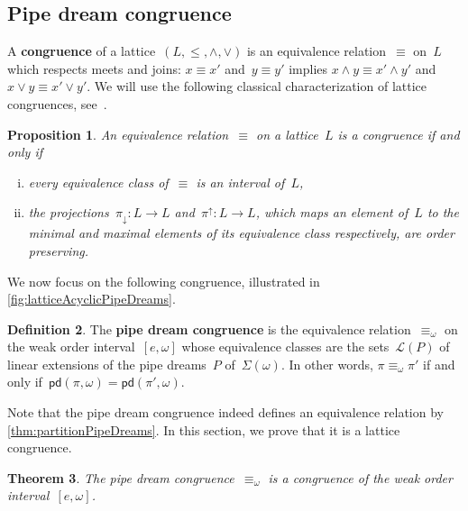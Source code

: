 \documentclass[reqno]{amsart}
\newtheorem{theorem}{Theorem}[section]
\newtheorem{proposition}[theorem]{Proposition}
\theoremstyle{definition}
\newtheorem{definition}[theorem]{Definition}
\newcommand{\defn}[1]{\textbf{\textsf{\color{PineGreen} #1}}} %
\newcommand{\acyclicPipeDreams}{\Sigma} %
\newcommand{\linearExtensions}{\mathcal{L}} %
\newcommand{\insertion}[2]{\mathsf{pd}(#1,#2)} %
\newcommand{\meet}{\wedge} %
\newcommand{\join}{\vee} %
\newcommand{\projDown}{\pi_\downarrow} %
\newcommand{\projUp}{\pi^\uparrow} %
\begin{document}

\subsection{Pipe dream congruence}
\label{subsec:pipeDreamCongruence}

A \defn{congruence} of a lattice~$(L, \le, \meet, \join)$ is an equivalence relation~$\equiv$ on~$L$ which respects meets and joins: $x \equiv x'$ and~$y \equiv y'$ implies $x \meet y \equiv x' \meet y'$ and~$x \join y \equiv x' \join y'$.
We will use the following classical characterization of lattice congruences, see~\cite{Reading-PosetRegionsChapter}.

\begin{proposition}
\label{prop:characterizationCongruences}
An equivalence relation~$\equiv$ on a lattice~$L$ is a congruence if and only if
\begin{enumerate}[(i)]
\item every equivalence class of~$\equiv$ is an interval of~$L$,
\item the projections~$\projDown : L \to L$ and~$\projUp : L \to L$, which maps an element of~$L$ to the minimal and maximal elements of its equivalence class respectively, are order preserving.
\end{enumerate}
\end{proposition}

We now focus on the following congruence, illustrated in \cref{fig:latticeAcyclicPipeDreams}.

\begin{definition}
\label{def:pipeDreamCongruence}
The \defn{pipe dream congruence} is the equivalence relation~$\equiv_\omega$ on the weak order interval~$[e,\omega]$ whose equivalence classes are the sets~$\linearExtensions(P)$ of linear extensions of the pipe dreams~$P$ of~$\acyclicPipeDreams(\omega)$.
In other words, $\pi \equiv_\omega \pi'$ if and only if~$\insertion{\pi}{\omega} = \insertion{\pi'}{\omega}$.
\end{definition}

Note that the pipe dream congruence indeed defines an equivalence relation by \cref{thm:partitionPipeDreams}.
In this section, we prove that it is a lattice congruence.

\begin{theorem}
\label{thm:pipeDreamCongruence}
The pipe dream congruence~$\equiv_\omega$ is a congruence of the weak order interval~$[e,\omega]$.
\end{theorem}
\end{document}
